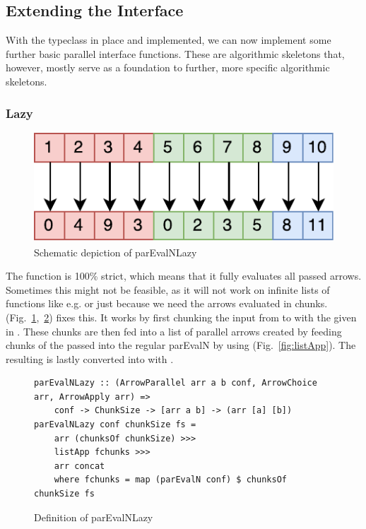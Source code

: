 \subsection{Extending the Interface}
\label{sec:extending-interface}
With the  typeclass in place and implemented, we can now implement some further basic parallel interface functions. These are algorithmic skeletons that, however, mostly serve as a foundation to further, more specific algorithmic skeletons.

\subsubsection{Lazy }
\begin{figure}[h]
	\includegraphics[scale=0.7]{images/parEvalNLazy}
	\caption{Schematic depiction of parEvalNLazy}
	\label{fig:parEvalNLazyImg}
\end{figure}
The function  is 100\% strict, which means that it fully evaluates all passed arrows. Sometimes this might not be feasible, as it will not work on infinite lists of functions like e.g.  or just because we need the arrows evaluated in chunks.  (Fig.~\ref{fig:parEvalNLazyImg},~\ref{fig:parEvalNLazy}) fixes this. It works by first chunking the input from \code{[a]} to \code{[[a]]} with the given  in . These chunks are then fed into a list \code{[arr [a] [b]]} of parallel arrows created by feeding chunks of the passed  into the regular parEvalN by using  (Fig.~\ref{fig:listApp}). The resulting \code{[[b]]} is lastly converted into \code{[b]} with .
\begin{figure}[h]
\begin{lstlisting}[frame=htrbl]
parEvalNLazy :: (ArrowParallel arr a b conf, ArrowChoice arr, ArrowApply arr) =>
	conf -> ChunkSize -> [arr a b] -> (arr [a] [b])
parEvalNLazy conf chunkSize fs =
	arr (chunksOf chunkSize) >>>
	listApp fchunks >>>
	arr concat
	where fchunks = map (parEvalN conf) $ chunksOf chunkSize fs
\end{lstlisting} %
\caption{Definition of parEvalNLazy}
\label{fig:parEvalNLazy}
\end{figure}

